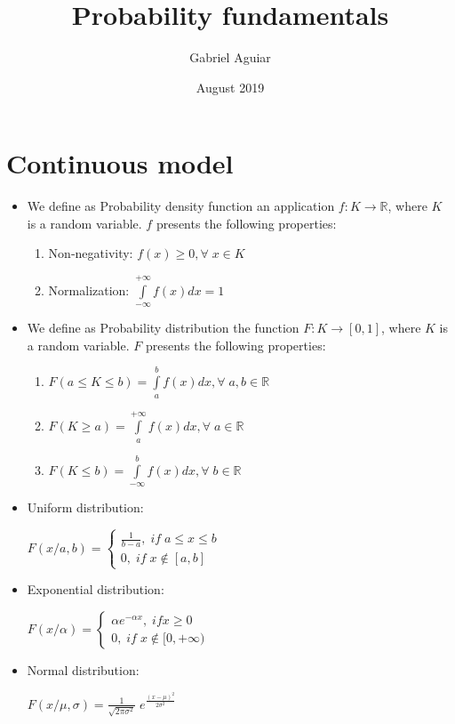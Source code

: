 \documentclass{article}
\title{Probability fundamentals}
\author{Gabriel Aguiar}
\date{August 2019}
\begin{document}
\maketitle

\section{Continuous model}

\begin{itemize}

\item We define as Probability density function an application $f: K \rightarrow \mathbb{R}$, where $K$ is a random variable. $f$ presents the following properties:

\begin{enumerate}

\item Non-negativity: $f(x) \geq 0, \forall \; x \in K$

\item Normalization: $\int\limits_{-\infty}^{+\infty} f(x) dx = 1$

\end{enumerate}

\item We define as Probability distribution the function $F: K \rightarrow [0,1]$, where $K$ is a random variable. $F$ presents the following properties:

\begin{enumerate}

\item $F(a \leq K \leq b) = \int\limits_{a}^{b} f(x) dx, \forall \; a,b \in \mathbb{R}$

\item $F(K \geq a) = \int\limits_{a}^{+\infty} f(x) dx, \forall \; a \in \mathbb{R}$

\item $F(K \leq b) = \int\limits_{-\infty}^{b} f(x) dx, \forall \; b \in \mathbb{R}$

\end{enumerate}

\item Uniform distribution:

$F(x/a,b) = \begin{cases} \frac{1}{b - a}, \; if \; a \leq x \leq b \\ 0, \; if \; x \notin [a,b] \end{cases}$

\item Exponential distribution:

$F(x/\alpha) = \begin{cases} \alpha e^{-\alpha x}, \; if x \geq 0 \\ 0, \; if \; x \notin [0,+\infty) \end{cases}$

\item Normal distribution:

$F(x/\mu,\sigma) = \frac{1}{\sqrt{2 \pi \sigma^{2}}} \; e^{\frac{(x - \mu)^{2}}{2 \sigma^{2}}}$
        
\end{itemize}
\end{document}
